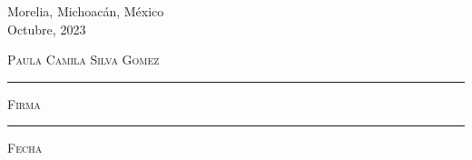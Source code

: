 \documentclass[12pt]{book}
\begin{document}
\begin{titlepage}
\begin{center}
\vfill

\begin{center}
{Morelia, Michoacán, México}\\
{Octubre, 2023}
\end{center}

\end{center}
\end{titlepage}


\thispagestyle{empty}
\vspace*{\fill}
\begingroup

\centering

\hspace{5em}

\textsc{Paula Camila Silva Gomez}

\vspace{5em}

\rule[1em]{20em}{0.5pt} %

\textsc{Firma}
 
\vspace{5em}

\rule[1em]{20em}{0.5pt} %

\textsc{Fecha}

\endgroup
\vspace*{\fill}




\end{document}
